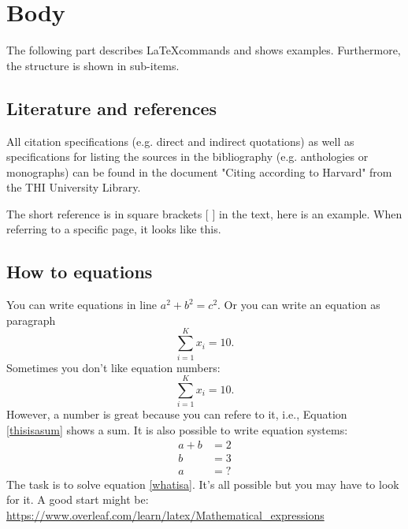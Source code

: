 \section{Body} %

The following part describes \LaTeX commands and shows examples. Furthermore, the structure is shown in sub-items.

\subsection{Literature and references} %

All citation specifications (e.g. direct and indirect quotations) as well as specifications for listing the sources in the bibliography (e.g. anthologies or monographs) can be found in the document "Citing according to Harvard" from the THI University Library.

The short reference is in square brackets [ ] in the text, here is an example\cite{Dreamer2025a}. When referring to a specific page, it looks like this\cite[S. 225]{Dreamer2025a}.



\subsection{How to equations} %
You can write equations in line ${a^2 + b^2 = c^2}$. Or you can write an equation as paragraph
\begin{equation}
    \label{thisisasum}
    \sum_{i=1}^K x_i = 10.
\end{equation}
Sometimes you don't like equation numbers:
\begin{equation*}
    \sum_{i=1}^K x_i = 10.
\end{equation*}
However, a number is great because you can refere to it, i.e., Equation \ref{thisisasum} shows a sum.
It is also possible to write equation systems:
\begin{align}
    a + b &= 2 \nonumber\\
    b & = 3 \nonumber\\
    a &= ? \label{whatisa}
\end{align}
The task is to solve equation \ref{whatisa}.
It's all possible but you may have to look for it.
A good start might be:
\url{https://www.overleaf.com/learn/latex/Mathematical_expressions}

